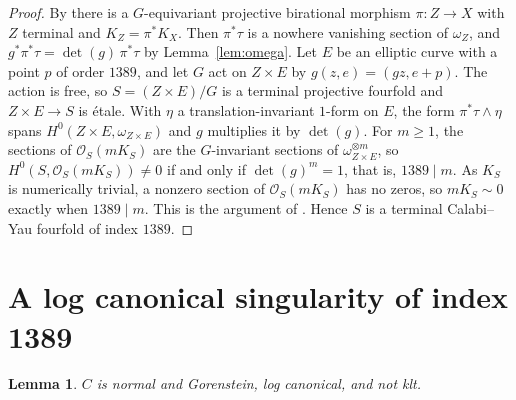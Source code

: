 \documentclass{amsart}
\newtheorem{lemma}[theorem]{Lemma}
\theoremstyle{remark}
\begin{document}
\begin{proof}
By \cite[Proposition~2.2]{ETW} there is a $G$-equivariant projective birational morphism $\pi\colon Z\to X$ with $Z$ terminal and $K_Z=\pi^*K_X$. Then $\pi^*\tau$ is a nowhere vanishing section of $\omega_Z$, and $g^*\pi^*\tau=\det(g)\,\pi^*\tau$ by Lemma~\ref{lem:omega}. Let $E$ be an elliptic curve with a point $p$ of order $1389$, and let $G$ act on $Z\times E$ by $g(z,e)=(gz,e+p)$. The action is free, so $S=(Z\times E)/G$ is a terminal projective fourfold and $Z\times E\to S$ is \'etale. With $\eta$ a translation-invariant $1$-form on $E$, the form $\pi^*\tau\wedge\eta$ spans $H^0(Z\times E,\omega_{Z\times E})$ and $g$ multiplies it by $\det(g)$. For $m\geq1$, the sections of $\mathcal O_S(mK_S)$ are the $G$-invariant sections of $\omega_{Z\times E}^{\otimes m}$, so $H^0(S,\mathcal O_S(mK_S))\neq0$ if and only if $\det(g)^m=1$, that is, $1389\mid m$. As $K_S$ is numerically trivial, a nonzero section of $\mathcal O_S(mK_S)$ has no zeros, so $mK_S\sim0$ exactly when $1389\mid m$. This is the argument of \cite[Corollary~4.1]{ETW}. Hence $S$ is a terminal Calabi--Yau fourfold of index $1389$.
\end{proof}

\section{A log canonical singularity of index 1389}\label{sec:loc}

\begin{lemma}\label{lem:cone}
$C$ is normal and Gorenstein, log canonical, and not klt.
\end{lemma}
\end{document}

